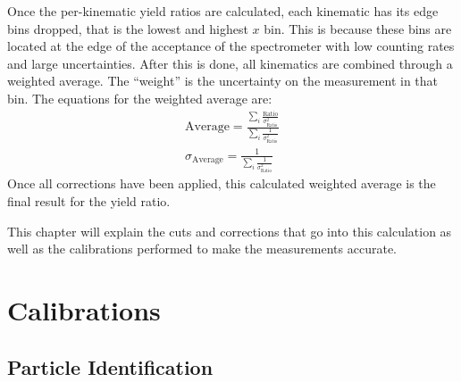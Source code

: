 Once the per-kinematic yield ratios are calculated, each kinematic has its edge bins dropped, that is the lowest and highest $x$ bin. This is because these bins are located at the edge of the acceptance of the spectrometer with low counting rates and large uncertainties. After this is done, all kinematics are combined through a weighted average. The ``weight'' is the uncertainty on the measurement in that bin. The equations for the weighted average are:
\begin{align}
	\text{Average} = \frac{\sum\limits_{i} \frac{\text{Ratio}}{\sigma^2_\text{Ratio}}}{\sum\limits_{i} \frac{1}{\sigma^2_\text{Ratio}}} \\
	\sigma_\text{Average} = \frac{1}{\sum\limits_{i} \frac{1}{\sigma^2_\text{Ratio}}}
\end{align}
Once all corrections have been applied, this calculated weighted average is the final result for the yield ratio.

This chapter will explain the cuts and corrections that go into this calculation as well as the calibrations performed to make the measurements accurate.

\section{Calibrations}



\subsection{Particle Identification}
